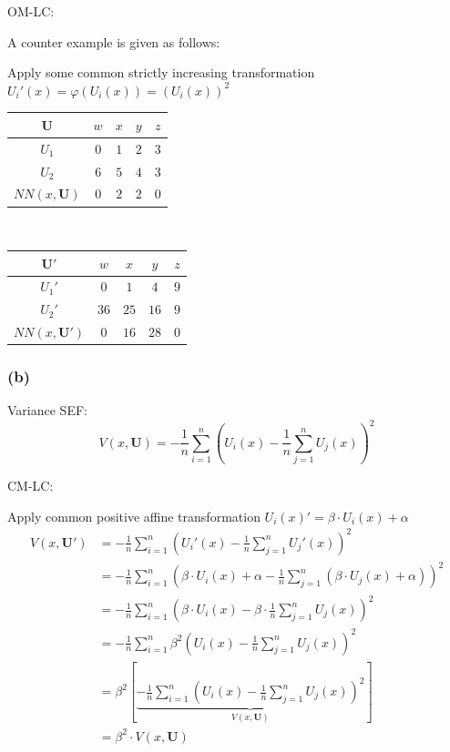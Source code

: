 \documentclass[a4paper]{article}
\begin{document}
OM-LC:

A counter example is given as follows:

Apply some common strictly increasing transformation $U_i'(x)=\varphi(U_i(x))=\left(U_i(x)\right)^2$
\begin{table}[!htbp]
    \centering
    \begin{tabular}{c|cccc|}
        $\mathbf{U}$ & $w$ & $x$ & $y$ & $z$    \\ 
        \hline
        $U_1$        & $0$ & $1$ & $2$ & $3$    \\
        $U_2$        & $6$ & $5$ & $4$ & $3$    \\
        \hline
        $NN(x,\mathbf{U})$ & $0$ & $2$ & $2$ & $0$ \\
    \end{tabular}
    $\qquad\qquad$
    \begin{tabular}{c|cccc|}
        $\mathbf{U'}$ & $w$  & $x$  & $y$  & $z$    \\ 
        \hline
        $U_1'$        & $0$  & $1$  & $4$  & $9$    \\
        $U_2'$        & $36$ & $25$ & $16$ & $9$    \\
        \hline
        $NN(x,\mathbf{U}')$ & $0$ & $16$ & $28$ & $0$ \\
    \end{tabular}
\end{table}

\subsubsection*{(b)}

Variance SEF:
\begin{equation*}
    V(x,\mathbf{U})=-\frac{1}{n}\sum_{i=1}^{n}\left(U_i(x)-\frac{1}{n}\sum_{j=1}^{n}U_j(x) \right)^2
\end{equation*}

CM-LC:

Apply common positive affine transformation $U_i(x)'=\beta\cdot U_i(x)+\alpha$
\begin{align*}
    V(x,\mathbf{U}')&=-\frac{1}{n}\sum_{i=1}^{n}\left(U_i'(x)-\frac{1}{n}\sum_{j=1}^{n}U_j'(x) \right)^2 \\
    &=-\frac{1}{n}\sum_{i=1}^{n}\left(\beta\cdot U_i(x)+\alpha-\frac{1}{n}\sum_{j=1}^{n}(\beta\cdot U_j(x)+\alpha) \right)^2 \\
    &=-\frac{1}{n}\sum_{i=1}^{n}\left(\beta\cdot U_i(x)-\beta\cdot \frac{1}{n}\sum_{j=1}^{n}U_j(x) \right)^2 \\
    &=-\frac{1}{n}\sum_{i=1}^{n}\beta^2\left(U_i(x)-\frac{1}{n}\sum_{j=1}^{n}U_j(x) \right)^2 \\
    &=\beta^2\left[\underbrace{-\frac{1}{n}\sum_{i=1}^{n}\left(U_i(x)-\frac{1}{n}\sum_{j=1}^{n}U_j(x) \right)^2}_{V(x,\mathbf{U})}\right] \\
    &=\beta^2\cdot V(x,\mathbf{U})
\end{align*}
\end{document}
